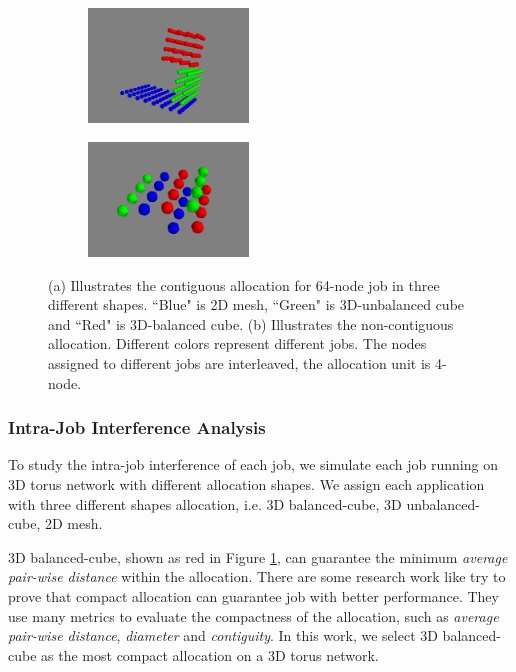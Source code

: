 \documentclass[conference]{IEEEtran}
\begin{document}
\begin{figure}[t!]
    \centering
    \begin{subfigure}[t]{0.2\textwidth}
        \centering
        \includegraphics[height=1.2in]{figs/cont/allocation}
        \caption{ }
        \label{fig:cont_sub1}
    \end{subfigure}%
    \hspace{1em}%
    \begin{subfigure}[t]{0.2\textwidth}
        \centering
        \includegraphics[height=1.2in]{figs/inter-job/noncont/sharing}
        \caption{ }
        \label{fig:noncont_sub1}
    \end{subfigure}%
    \caption{(a) Illustrates the contiguous allocation for 64-node job in three different shapes. ``Blue" is 2D mesh, ``Green" is 3D-unbalanced cube and ``Red" is 3D-balanced cube. (b) Illustrates the non-contiguous allocation. Different colors represent different jobs. The nodes assigned to different jobs are interleaved, the allocation unit is 4-node.}
\end{figure}


\subsubsection{Intra-Job Interference Analysis}
\label{sec: introjob}

To study the intra-job interference of each job, we simulate each job running on 3D torus network with different allocation shapes. We assign each application with three different shapes allocation, i.e. 3D balanced-cube, 3D unbalanced-cube, 2D mesh.

3D balanced-cube, shown as red in Figure \ref{fig:cont_sub1}, can guarantee the minimum \emph{average pair-wise distance} within the allocation. There are some research work like \cite{leung} \cite{abhinav-sc13} try to prove that compact allocation can guarantee job with better performance. They use many metrics to evaluate the compactness of the allocation, such as \emph{average pair-wise distance}, \emph{diameter} and \emph{contiguity}. In this work, we select 3D balanced-cube as the most compact allocation on a 3D torus network. 
\end{document}
